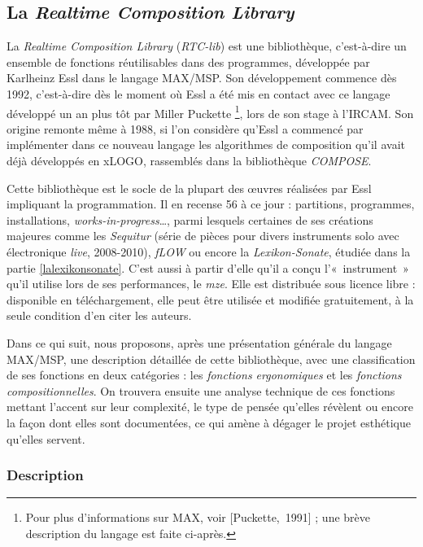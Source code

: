 \documentclass[a4paper,12pt]{article}
\newcommand{\guill}[1]{«~#1~»}
\newcommand{\maze}[0]{\emph{m\symbol{64}ze\textdegree2}}
\newcommand{\cicite}[1]{{\footnotesize[#1]}}
\begin{document}
\subsection{La \emph{Realtime Composition Library}}
\label{rtclib}

La \emph{Realtime Composition Library} (\emph{RTC-lib}) est une bibliothèque, c'est-à-dire un ensemble de fonctions réutilisables dans des programmes, développée par Karlheinz Essl dans le langage MAX/MSP. Son développement commence dès 1992, c'est-à-dire dès le moment où Essl a été mis en contact avec ce langage développé un an plus tôt par Miller Puckette \footnote{Pour plus d'informations sur MAX, voir \cicite{Puckette,~1991} ; une brève description du langage est faite ci-après.}, lors de son stage à l'IRCAM. Son origine remonte même à 1988, si l'on considère qu'Essl a commencé par implémenter dans ce nouveau langage les algorithmes de composition qu'il avait déjà développés en xLOGO, rassemblés dans la bibliothèque \emph{COMPOSE}.

Cette bibliothèque est le socle de la plupart des œuvres réalisées par Essl impliquant la programmation. Il en recense 56 à ce jour : partitions, programmes, installations, \emph{works-in-progress}\dots, parmi lesquels certaines de ses créations majeures comme les \emph{Sequitur} (série de pièces pour divers instruments solo avec électronique \emph{live}, 2008-2010), \emph{fLOW} ou encore la \emph{Lexikon-Sonate}, étudiée dans la partie \ref{lalexikonsonate}. C'est aussi à partir d'elle qu'il a conçu l'\guill{instrument} qu'il utilise lors de ses performances, le \maze. Elle est distribuée sous licence libre : disponible en téléchargement, elle peut être utilisée et modifiée gratuitement, à la seule condition d'en citer les auteurs.

Dans ce qui suit, nous proposons, après une présentation générale du langage MAX/MSP, une description détaillée de cette bibliothèque, avec une classification de ses fonctions en deux catégories : les \emph{fonctions ergonomiques} et les \emph{fonctions compositionnelles}. On trouvera ensuite une analyse technique de ces fonctions mettant l'accent sur leur complexité, le type de pensée qu'elles révèlent ou encore la façon dont elles sont documentées, ce qui amène à dégager le projet esthétique qu'elles servent.

\subsubsection{Description}
\end{document}
